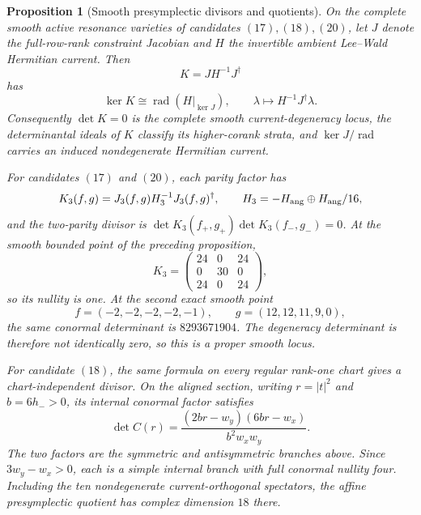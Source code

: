 \documentclass[11pt]{article}
\newtheorem{proposition}[theorem]{Proposition}
\theoremstyle{definition}
\theoremstyle{remark}
\begin{document}
\begin{proposition}[Smooth presymplectic divisors and quotients]
\label{prop:smooth-presymplectic-divisors}
On the complete smooth active resonance varieties of candidates
\((17),(18),(20)\), let \(J\) denote the full-row-rank constraint Jacobian
and \(H\) the invertible ambient Lee--Wald Hermitian current.  Then
\[
 K=JH^{-1}J^\dagger
\]
has
\[
 \ker K\cong\operatorname{rad}\!\left(H|_{\ker J}\right),
 \qquad
 \lambda\longmapsto H^{-1}J^\dagger\lambda .
\]
Consequently \(\det K=0\) is the complete smooth current-degeneracy locus,
the determinantal ideals of \(K\) classify its higher-corank strata, and
\(\ker J/\operatorname{rad}\) carries an induced nondegenerate Hermitian
current.

For candidates \((17)\) and \((20)\), each parity factor has
\[
 K_3(f,g)=J_3(f,g)H_3^{-1}J_3(f,g)^\dagger,
 \qquad H_3=-H_{\rm ang}\oplus H_{\rm ang}/16,
\]
and the two-parity divisor is
\(\det K_3(f_+,g_+)\det K_3(f_-,g_-)=0\).
At the smooth bounded point of the preceding proposition,
\[
 K_3=
 \begin{pmatrix}
 24&0&24\\
 0&30&0\\
 24&0&24
 \end{pmatrix},
\]
so its nullity is one.
At the second exact smooth point
\[
 f=(-2,-2,-2,-2,-1),\qquad g=(12,12,11,9,0),
\]
the same conormal determinant is \(8293671904\).  The degeneracy determinant
is therefore not identically zero, so this is a proper smooth locus.

For candidate \((18)\), the same formula on every regular rank-one chart
gives a chart-independent divisor.  On the aligned section, writing
\(r=|t|^2\) and \(b=6h_->0\), its internal conormal factor satisfies
\[
 \det C(r)=
 \frac{(2br-w_y)(6br-w_x)}{b^2w_xw_y}.
\]
The two factors are the symmetric and antisymmetric branches above.  Since
\(3w_y-w_x>0\), each is a simple internal branch with full conormal nullity
four.  Including the ten nondegenerate current-orthogonal spectators, the
affine presymplectic quotient has complex dimension \(18\) there.
\end{proposition}
\end{document}
